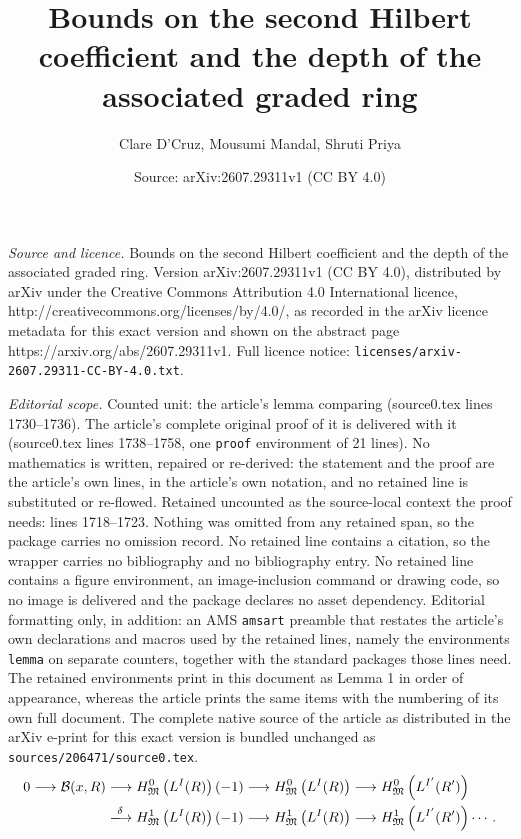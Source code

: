 \documentclass[10pt,a4paper]{amsart}
\title{Bounds on the second Hilbert coefficient and the depth of the associated graded ring}
\author{Clare D'Cruz, Mousumi Mandal, Shruti Priya}
\date{Source: arXiv:2607.29311v1 (CC BY 4.0)}
\newcommand{\M}{\mathfrak{M}}
\begin{document}
\maketitle

\noindent\emph{Source and licence.} Bounds on the second Hilbert coefficient and the depth of the associated graded ring. Version arXiv:2607.29311v1 (CC BY 4.0), distributed by arXiv under the Creative Commons Attribution 4.0 International licence, http://creativecommons.org/licenses/by/4.0/, as recorded in the arXiv licence metadata for this exact version and shown on the abstract page https://arxiv.org/abs/2607.29311v1. Full licence notice: \texttt{licenses/arxiv-2607.29311-CC-BY-4.0.txt}.\par\smallskip

\noindent\textit{Editorial scope.} Counted unit: the article's lemma comparing (source0.tex lines 1730--1736). The article's complete original proof of it is delivered with it (source0.tex lines 1738--1758, one \texttt{proof} environment of 21 lines). No mathematics is written, repaired or re-derived: the statement and the proof are the article's own lines, in the article's own notation, and no retained line is substituted or re-flowed.  Retained uncounted as the source-local context the proof needs: lines 1718--1723.  Nothing was omitted from any retained span, so the package carries no omission record.  No retained line contains a citation, so the wrapper carries no bibliography and no bibliography entry.  No retained line contains a figure environment, an image-inclusion command or drawing code, so no image is delivered and the package declares no asset dependency.  Editorial formatting only, in addition: an AMS \texttt{amsart} preamble that restates the article's own declarations and macros used by the retained lines, namely the environments \texttt{lemma} on separate counters, together with the standard packages those lines need.  The retained environments print in this document as Lemma 1 in order of appearance, whereas the article prints the same items with the numbering of its own full document.  The complete native source of the article as distributed in the arXiv e-print for this exact version is bundled unchanged as \texttt{sources/206471/source0.tex}.
\begin{equation} \label{4}
    \begin{aligned}
        0 \longrightarrow \mathcal{B}(x,R)  &  \longrightarrow H^{0}_{\M}\left(L^{I}(R)\right)(-1) \longrightarrow H^{0}_{\M}\left(L^{I}(R)\right) \longrightarrow H^{0}_{\M}\left(L^{I'}(R')\right) \\
     & \xlongrightarrow{\delta} H^{1}_{\M}\left(L^{I}(R)\right)(-1) \longrightarrow H^{1}_{\M}\left(L^{I}(R)\right) \longrightarrow H^{1}_{\M}\left(L^{I'}(R')\right) \cdots.
    \end{aligned}
\end{equation}
\end{document}
